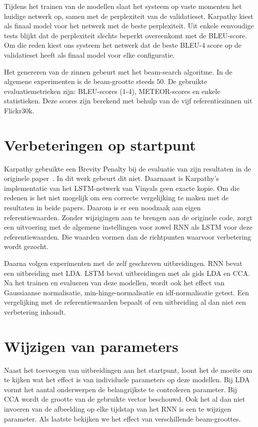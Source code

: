 Tijdens het trainen van de modellen slaat het systeem op vaste momenten het huidige netwerk op, samen met de perplexiteit van de validatieset. Karpathy kiest als finaal model voor het netwerk met de beste perplexiteit. Uit enkele eenvoudige tests blijkt dat de perplexiteit slechts beperkt overeenkomt met de BLEU-score. Om die reden kiest ons systeem het netwerk dat de beste BLEU-4 score op de validatieset heeft als finaal model voor elke configuratie.

Het genereren van de zinnen gebeurt met het beam-search algoritme. In de algemene experimenten is de beam-grootte steeds $50$.
De gebruikte evaluatiemetrieken zijn: BLEU-scores (1-4), METEOR-scores en enkele statistieken. Deze scores zijn berekend met behulp van de vijf referentiezinnen uit Flickr30k.

\section{Verbeteringen op startpunt}
Karpathy gebruikte een Brevity Penalty bij de evaluatie van zijn resultaten in de originele paper~\cite{Karpathy2015}. In dit werk gebeurt dit niet. Daarnaast is Karpathy's implementatie van het LSTM-netwerk van Vinyals geen exacte kopie. Om die redenen is het niet mogelijk om een correcte vergelijking te maken met de resultaten in beide papers. Daarom is er een noodzaak aan eigen referentiewaarden. Zonder wijzigingen aan te brengen aan de originele code, zorgt een uitvoering met de algemene instellingen voor zowel RNN als LSTM voor deze referentiewaarden. Die waarden vormen dan de richtpunten waarvoor verbetering wordt gezocht.

Daarna volgen experimenten met de zelf geschreven uitbreidingen. RNN bevat een uitbreiding met LDA. LSTM bevat uitbreidingen met als gids LDA en CCA.
Na het trainen en evalueren van deze modellen, wordt ook het effect van Gaussiaanse normalisatie, min-hinge-normalisatie en idf-normalisatie getest.
Een vergelijking met de referentiewaarden bepaalt of een uitbreiding al dan niet een verbetering inhoudt.

\section{Wijzigen van parameters}
Naast het toevoegen van uitbreidingen aan het startpunt, loont het de moeite om te kijken wat het effect is van individuele parameters op deze modellen. Bij LDA vormt het aantal onderwerpen de belangrijkste te controleren parameter. Bij CCA wordt de grootte van de gebruikte vector beschouwd. Ook het al dan niet invoeren van de afbeelding op elke tijdstap van het RNN is een te wijzigen parameter. Als laatste bekijken we het effect van verschillende beam-groottes.

